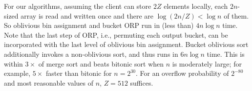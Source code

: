 For our algorithms, assuming the client can store $2Z$ elements locally, each $2n$-sized array is read and written once and there are $\log(2n/Z)<\log n$ of them.
So oblivious bin assignment and bucket ORP run in (less than) $4n\log n$ time.
Note that the last step of ORP, i.e., permuting each output bucket, can be incorporated with the last level of oblivious bin assignment.
Bucket oblivious sort additionally invokes a non-oblivious sort, and thus runs in $6n\log n$ time. 
This is within $3\times$ of merge sort and beats bitonic sort when $n$ is moderately large;
for example, $5\times$ faster than bitonic for $n=2^{30}$.
For an overflow probability of $2^{-80}$ and most reasonable values of $n$, $Z = 512$ suffices. 


